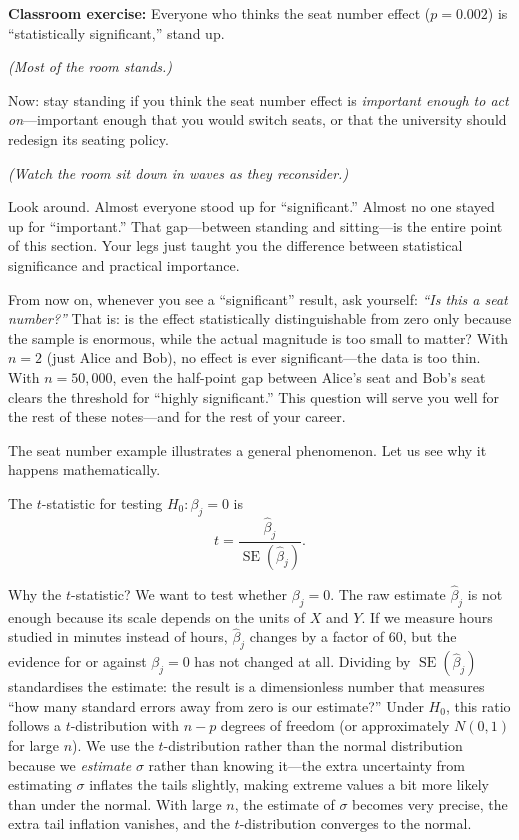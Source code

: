 \documentclass[11pt,a4paper]{article}
\theoremstyle{definition}
\theoremstyle{plain}
\theoremstyle{remark}
\newcommand{\se}{\operatorname{SE}}
\newcommand{\bhat}{\hat{\beta}}
\begin{document}
\begin{tcolorbox}[colback=truthgold!5, colframe=truthgold!80!black, fonttitle=\bfseries, title={Stand Up If Significant}]
\textbf{Classroom exercise:} Everyone who thinks the seat number effect ($p = 0.002$) is ``statistically significant,'' stand up.

\emph{(Most of the room stands.)}

Now: stay standing if you think the seat number effect is \emph{important enough to act on}---important enough that you would switch seats, or that the university should redesign its seating policy.

\emph{(Watch the room sit down in waves as they reconsider.)}

Look around. Almost everyone stood up for ``significant.'' Almost no one stayed up for ``important.'' That gap---between standing and sitting---is the entire point of this section. Your legs just taught you the difference between statistical significance and practical importance.
\end{tcolorbox}

\begin{keyinsight}
From now on, whenever you see a ``significant'' result, ask yourself: \emph{``Is this a seat number?''} That is: is the effect statistically distinguishable from zero only because the sample is enormous, while the actual magnitude is too small to matter? With $n=2$ (just Alice and Bob), no effect is ever significant---the data is too thin. With $n = 50{,}000$, even the half-point gap between Alice's seat and Bob's seat clears the threshold for ``highly significant.'' This question will serve you well for the rest of these notes---and for the rest of your career.
\end{keyinsight}

The seat number example illustrates a general phenomenon. Let us see why it happens mathematically.

The $t$-statistic for testing $H_0: \beta_j = 0$ is
\begin{equation}\label{eq:tstat}
  t = \frac{\bhat_j}{\se(\bhat_j)}.
\end{equation}

Why the $t$-statistic? We want to test whether $\beta_j = 0$. The raw estimate $\bhat_j$ is not enough because its scale depends on the units of $X$ and $Y$. If we measure hours studied in minutes instead of hours, $\bhat_j$ changes by a factor of 60, but the evidence for or against $\beta_j = 0$ has not changed at all. Dividing by $\se(\bhat_j)$ standardises the estimate: the result is a dimensionless number that measures ``how many standard errors away from zero is our estimate?'' Under $H_0$, this ratio follows a $t$-distribution with $n - p$ degrees of freedom (or approximately $N(0,1)$ for large $n$). We use the $t$-distribution rather than the normal distribution because we \emph{estimate} $\sigma$ rather than knowing it---the extra uncertainty from estimating $\sigma$ inflates the tails slightly, making extreme values a bit more likely than under the normal. With large $n$, the estimate of $\sigma$ becomes very precise, the extra tail inflation vanishes, and the $t$-distribution converges to the normal.
\end{document}
